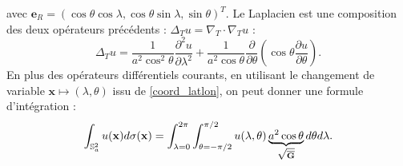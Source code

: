 avec $\mathbf{e}_{R} = \left( \cos \theta \cos \lambda, \cos \theta \sin \lambda, \sin \theta \right)^T$. Le Laplacien est une composition des deux opérateurs précédents : $\Delta_T u = \nabla_T \cdot \nabla_T u$ :
\begin{equation}\label{laplacien_lonlat}
\Delta_T u = \dfrac{1}{a^2 \cos^2 \theta} \dfrac{\partial^2 u }{\partial \lambda^2} + \dfrac{1}{a^2 \cos \theta} \dfrac{\partial}{\partial \theta} \left( \cos \theta \dfrac{\partial u}{\partial \theta} \right).
\end{equation}
En plus des opérateurs différentiels courants, en utilisant le changement de variable $\mathbf{x} \mapsto (\lambda, \theta)$ issu de \eqref{coord_latlon}, on peut donner une formule d'intégration :
\begin{equation}\label{integrale_lonlat}
\displaystyle\int_{\mathbb{S}_a^2} u(\mathbf{x})d\sigma(\mathbf{x})= \displaystyle\int_{\lambda=0}^{2 \pi} \displaystyle\int_{\theta = - \pi/2}^{\pi/2} u(\lambda, \theta) \underbrace{a^2 \cos \theta}_{\sqrt{\overline{\mathbf{G}}}} d \theta d \lambda.
\end{equation}
